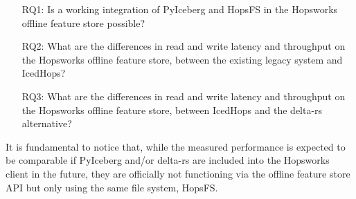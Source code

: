 \begin{enumerate}
    \item[RQ1:] Is a working integration of PyIceberg and HopsFS in the Hopsworks offline feature store possible?
    \item[RQ2:] What are the differences in read and write latency and throughput on the Hopsworks offline feature store, between the existing legacy system and IcedHops?
    \item[RQ3:] What are the differences in read and write latency and throughput on the Hopsworks offline feature store, between IcedHops and the delta-rs alternative?
\end{enumerate}

It is fundamental to notice that, while the measured performance is expected to be comparable if PyIceberg and/or delta-rs are included into the Hopsworks client in the future, they are officially not functioning via the offline feature store \gls{API} but only using the same file system, \gls{HopsFS}.
